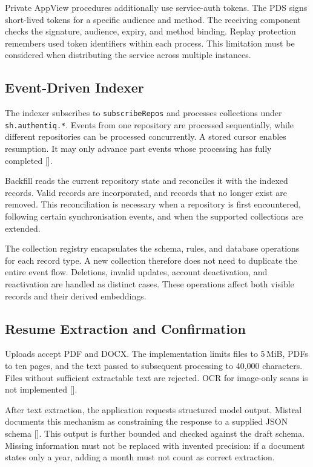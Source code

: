 \documentclass[11pt,a4paper]{article}
\newcommand{\code}[1]{\texttt{#1}}
\newcommand{\reflink}[1]{\hyperlink{ref:#1}{#1}}
\newcommand{\refsep}{}
\newcommand{\refs}[1]{\begingroup
  \gdef\refsep{}%
  \renewcommand*{\do}[1]{\refsep\reflink{##1}\gdef\refsep{, }}%
  [\docsvlist{#1}]\endgroup}
\begin{document}
Private AppView procedures additionally use service-auth tokens. The PDS signs short-lived tokens for a specific audience and method. The receiving component checks the signature, audience, expiry, and method binding. Replay protection remembers used token identifiers within each process. This limitation must be considered when distributing the service across multiple instances.

\subsection{Event-Driven Indexer}

The indexer subscribes to \code{subscribeRepos} and processes collections under \code{sh.authentiq.*}. Events from one repository are processed sequentially, while different repositories can be processed concurrently. A stored cursor enables resumption. It may only advance past events whose processing has fully completed \refs{P4}.

Backfill reads the current repository state and reconciles it with the indexed records. Valid records are incorporated, and records that no longer exist are removed. This reconciliation is necessary when a repository is first encountered, following certain synchronisation events, and when the supported collections are extended.

The collection registry encapsulates the schema, rules, and database operations for each record type. A new collection therefore does not need to duplicate the entire event flow. Deletions, invalid updates, account deactivation, and reactivation are handled as distinct cases. These operations affect both visible records and their derived embeddings.

\subsection{Resume Extraction and Confirmation}

Uploads accept PDF and DOCX. The implementation limits files to 5\,MiB, PDFs to ten pages, and the text passed to subsequent processing to 40,000 characters. Files without sufficient extractable text are rejected. OCR for image-only scans is not implemented \refs{P5}.

After text extraction, the application requests structured model output. Mistral documents this mechanism as constraining the response to a supplied JSON schema \refs{L9}. This output is further bounded and checked against the draft schema. Missing information must not be replaced with invented precision: if a document states only a year, adding a month must not count as correct extraction.
\end{document}
